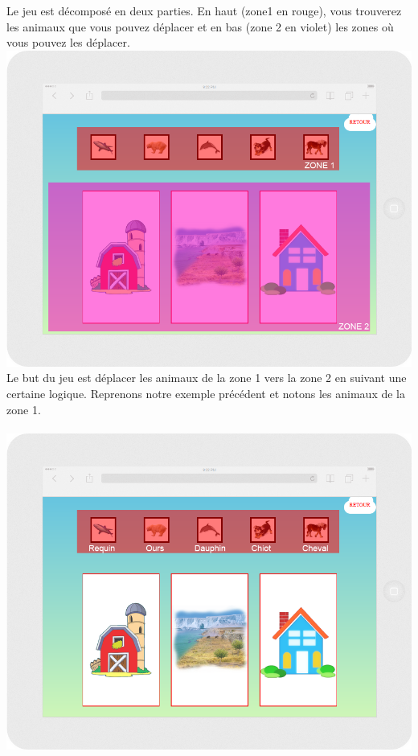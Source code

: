 \documentclass{article}
\begin{document}
Le jeu est décomposé en deux parties. En haut (zone1 en rouge), vous trouverez les animaux que vous pouvez déplacer et en bas (zone 2 en violet) les zones o\`u vous pouvez les déplacer.
\vspace{0.5cm}\\
\includegraphics[width=1.0\textwidth]{zone}
\vspace{0.5cm}\\
Le but du jeu est déplacer les animaux de la zone 1 vers la zone 2 en suivant une certaine logique. Reprenons notre exemple précédent et notons les animaux de la zone 1.\\
\vspace{0.5cm}\\
\includegraphics[width=1.0\textwidth]{zone1}
\end{document}
